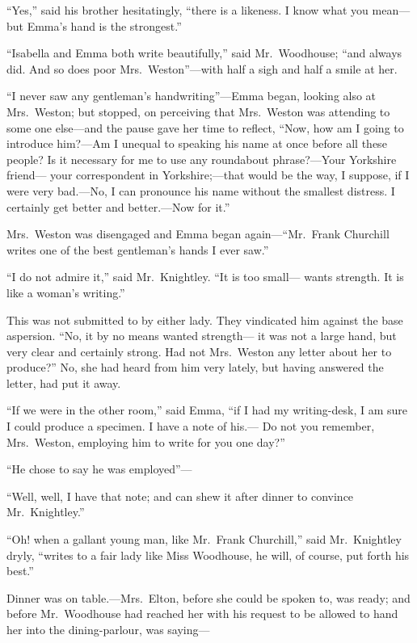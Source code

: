 ``Yes,'' said his brother hesitatingly, ``there is a likeness.
I know what you mean---but Emma's hand is the strongest.''

``Isabella and Emma both write beautifully,'' said Mr.\ Woodhouse;
``and always did.  And so does poor Mrs.\ Weston''---with half a sigh
and half a smile at her.

``I never saw any gentleman's handwriting''---Emma began, looking also
at Mrs.\ Weston; but stopped, on perceiving that Mrs.\ Weston was
attending to some one else---and the pause gave her time to reflect,
``Now, how am I going to introduce him?---Am I unequal to speaking
his name at once before all these people?  Is it necessary
for me to use any roundabout phrase?---Your Yorkshire friend---%
your correspondent in Yorkshire;---that would be the way, I suppose,
if I were very bad.---No, I can pronounce his name without the
smallest distress.  I certainly get better and better.---Now for it.''

Mrs.\ Weston was disengaged and Emma began again---``Mr.\ Frank Churchill
writes one of the best gentleman's hands I ever saw.''

``I do not admire it,'' said Mr.\ Knightley.  ``It is too small---%
wants strength.  It is like a woman's writing.''

This was not submitted to by either lady.  They vindicated him
against the base aspersion.  ``No, it by no means wanted strength---%
it was not a large hand, but very clear and certainly strong.
Had not Mrs.\ Weston any letter about her to produce?''  No, she had
heard from him very lately, but having answered the letter, had put
it away.

``If we were in the other room,'' said Emma, ``if I had my writing-desk,
I am sure I could produce a specimen.  I have a note of his.---%
Do not you remember, Mrs.\ Weston, employing him to write for you
one day?''

``He chose to say he was employed''---%

``Well, well, I have that note; and can shew it after dinner
to convince Mr.\ Knightley.''

``Oh! when a gallant young man, like Mr.\ Frank Churchill,''
said Mr.\ Knightley dryly, ``writes to a fair lady like Miss Woodhouse,
he will, of course, put forth his best.''

Dinner was on table.---Mrs.\ Elton, before she could be spoken to,
was ready; and before Mr.\ Woodhouse had reached her with his request
to be allowed to hand her into the dining-parlour, was saying---%

